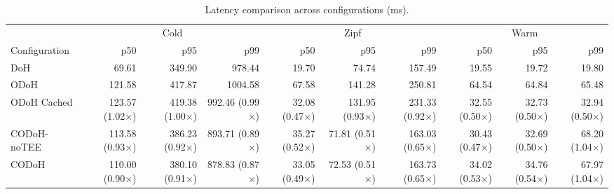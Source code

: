 \begin{table}[t]
\centering
\caption{Latency comparison across configurations (ms).}
\label{tab:comparison}
\small
\begin{tabular}{l rrr rrr rrr}
\toprule
 & \multicolumn{3}{c}{Cold} & \multicolumn{3}{c}{Zipf} & \multicolumn{3}{c}{Warm} \\
\cmidrule(lr){2-4} \cmidrule(lr){5-7} \cmidrule(lr){8-10}
Configuration & p50 & p95 & p99 & p50 & p95 & p99 & p50 & p95 & p99 \\
\midrule
DoH & 69.61 & 349.90 & 978.44 & 19.70 & 74.74 & 157.49 & 19.55 & 19.72 & 19.80 \\
ODoH & 121.58 & 417.87 & 1004.58 & 67.58 & 141.28 & 250.81 & 64.54 & 64.84 & 65.48 \\
ODoH Cached & 123.57 (1.02$\times$) & 419.38 (1.00$\times$) & 992.46 (0.99$\times$) & 32.08 (0.47$\times$) & 131.95 (0.93$\times$) & 231.33 (0.92$\times$) & 32.55 (0.50$\times$) & 32.73 (0.50$\times$) & 32.94 (0.50$\times$) \\
CODoH-noTEE & 113.58 (0.93$\times$) & 386.23 (0.92$\times$) & 893.71 (0.89$\times$) & 35.27 (0.52$\times$) & 71.81 (0.51$\times$) & 163.03 (0.65$\times$) & 30.43 (0.47$\times$) & 32.69 (0.50$\times$) & 68.20 (1.04$\times$) \\
CODoH & 110.00 (0.90$\times$) & 380.10 (0.91$\times$) & 878.83 (0.87$\times$) & 33.05 (0.49$\times$) & 72.53 (0.51$\times$) & 163.73 (0.65$\times$) & 34.02 (0.53$\times$) & 34.76 (0.54$\times$) & 67.97 (1.04$\times$) \\
\bottomrule
\end{tabular}
\end{table}

